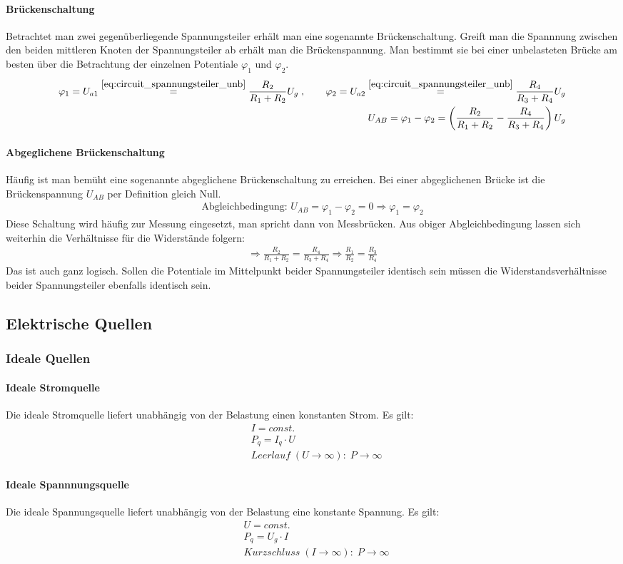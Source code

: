 \documentclass[12pt,a4paper]{article}%
\numberwithin{equation}{section}
\newcommand{\subsubsubsection}{\paragraph}
\begin{document}
\subsubsubsection{Brückenschaltung}
Betrachtet man zwei gegenüberliegende Spannungsteiler erhält man eine sogenannte Brückenschaltung. Greift man die Spannnung zwischen den beiden mittleren Knoten der Spannungsteiler ab erhält man die Brückenspannung. Man bestimmt sie bei einer unbelasteten Brücke am besten über die Betrachtung der einzelnen Potentiale $\varphi_1$ und $\varphi_2$.
\begin{align}
\varphi_1 = U_{a1} \overset{\eqref{eq:circuit_spannungsteiler_unb}}{=} \frac{R_2}{R_1 + R_2} U_g \; , 
\qquad \varphi_2 = U_{a2} \overset{\eqref{eq:circuit_spannungsteiler_unb}}{=} \frac{R_4}{R_3 + R_4} U_g \nonumber \\
U_{AB} = \varphi_1 - \varphi_2 = \left( \frac{R_2}{R_1 + R_2} - \frac{R_4}{R_3 + R_4} \right) U_g
\end{align}

\subsubsubsection{Abgeglichene Brückenschaltung}
Häufig ist man bemüht eine sogenannte abgeglichene Brückenschaltung zu erreichen. Bei einer abgeglichenen Brücke ist die Brückenspannung $U_{AB}$ per Definition gleich Null. 
\begin{align}
\text{Abgleichbedingung: } U_{AB} = \varphi_1 - \varphi_2 = 0 \Rightarrow \varphi_1 = \varphi_2
\end{align}
Diese Schaltung wird häufig zur Messung eingesetzt, man spricht dann von Messbrücken. Aus obiger Abgleichbedingung lassen sich weiterhin die Verhältnisse für die Widerstände folgern:
\begin{align}
\Rightarrow \frac{R_2}{R_1 + R_2} = \frac{R_4}{R_3 + R_4} \Rightarrow \frac{R_1}{R_2} = \frac{R_3}{R_4}
\end{align}
Das ist auch ganz logisch. Sollen die Potentiale im Mittelpunkt beider Spannungsteiler identisch sein müssen die Widerstandsverhältnisse beider Spannungsteiler ebenfalls identisch sein.

  \subsection{Elektrische Quellen}
  \subsubsection{Ideale Quellen}
  \subsubsubsection{Ideale Stromquelle}
  Die ideale Stromquelle liefert unabhängig von der Belastung einen konstanten Strom. Es gilt:
  \begin{align}
    &I = const.\\
    &P_q = I_q \cdot U\\
    &Leerlauf\;(U\rightarrow \infty):\; P \rightarrow \infty    
  \end{align}
  \subsubsubsection{Ideale Spannnungsquelle}
  Die ideale Spannungsquelle liefert unabhängig von der Belastung eine konstante Spannung. Es gilt:
  \begin{align}
    &U = const.\\
    &P_q = U_g \cdot I\\
    &Kurzschluss\;(I \rightarrow \infty):\; P\rightarrow \infty
  \end{align}
  
\end{document}
